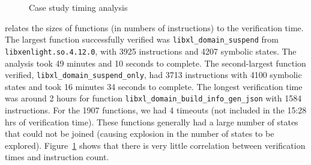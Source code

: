 \begin{figure}
  \centering
  \caption{Case study timing analysis}\label{fig:distr}
\end{figure}
 relates the sizes of functions (in numbers of instructions) to the verification time.
The largest function successfully verified was \lstinline|libxl_domain_suspend| from \lstinline|libxenlight.so.4.12.0|, with 3925 instructions and 4207 symbolic states. The analysis took 49 minutes and 10 seconds to complete. The second-largest function verified, \lstinline|libxl_domain_suspend_only|, had 3713 instructions with 4100 symbolic states and took 16 minutes 34 seconds to complete. The longest verification time was around 2 hours for function \lstinline|libxl_domain_build_info_gen_json| with 1584 instructions.
For the 1907 functions, we had 4 timeouts (not included in the 15:28 hrs of verification time). These functions generally had a large number of states that could not be joined (causing explosion in the number of states to be explored).
Figure~\ref{fig:distr}  shows that there is very little correlation between verification times and instruction count.

